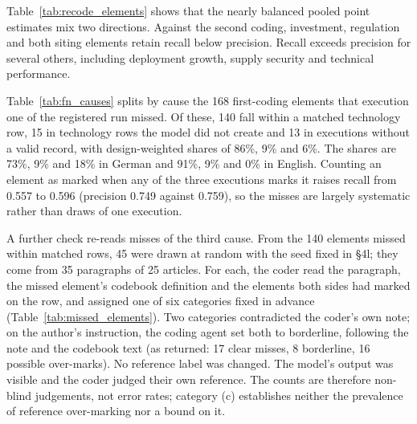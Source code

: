 \begingroup\let\footnotesize\scriptsize\endgroup

Table~\ref{tab:recode_elements} shows that the nearly balanced pooled point estimates mix two directions. Against the second coding, investment, regulation and both siting elements retain recall below precision. Recall exceeds precision for several others, including deployment growth, supply security and technical performance.



Table~\ref{tab:fn_causes} splits by cause the 168 first-coding elements that execution one of the registered run missed. Of these, 140 fall within a matched technology row, 15 in technology rows the model did not create and 13 in executions without a valid record, with design-weighted shares of 86\%, 9\% and 6\%. The shares are 73\%, 9\% and 18\% in German and 91\%, 9\% and 0\% in English. Counting an element as marked when any of the three executions marks it raises recall from 0.557 to 0.596 (precision 0.749 against 0.759), so the misses are largely systematic rather than draws of one execution.



A further check re-reads misses of the third cause. From the 140 elements missed within matched rows, 45 were drawn at random with the seed fixed in \S4l; they come from 35 paragraphs of 25 articles. For each, the coder read the paragraph, the missed element's codebook definition and the elements both sides had marked on the row, and assigned one of six categories fixed in advance (Table~\ref{tab:missed_elements}). Two categories contradicted the coder's own note; on the author's instruction, the coding agent set both to borderline, following the note and the codebook text (as returned: 17 clear misses, 8 borderline, 16 possible over-marks). No reference label was changed. The model's output was visible and the coder judged their own reference. The counts are therefore non-blind judgements, not error rates; category (c) establishes neither the prevalence of reference over-marking nor a bound on it.

